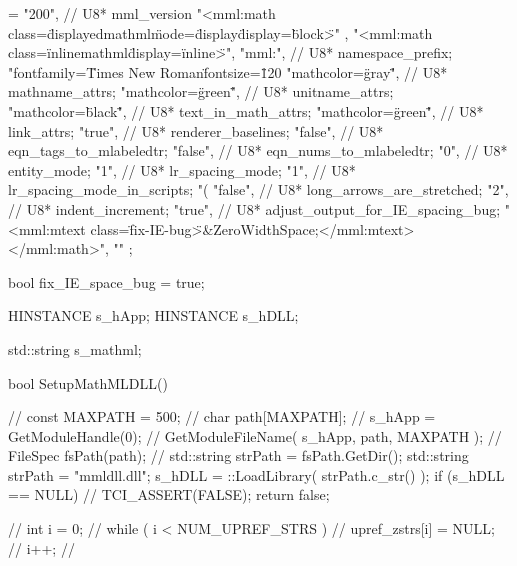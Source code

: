 {{{{{{{{{{\fwbeginmacro
{}\fwplusequals \fwodef \fwbtx[const int NUM_UPREF_STRS = 20;
const int FIX_IE_BUG = 18;

char *upref_zstrs[] = {
  "200",                           // U8* mml_version
  "<mml:math class=\"displayedmathml\" mode=\"display\" display=\"block\">" ,
  "<mml:math class=\"inlinemathml\" display=\"inline\">",
  "mml:",                         //  U8* namespace_prefix;
  "fontfamily=\"Times New Roman\" fontsize=\"120%
  "mathcolor=\"gray\"",           //  U8* mathname_attrs;
  "mathcolor=\"green\"",          //  U8* unitname_attrs;
  "mathcolor=\"black\"",          //  U8* text_in_math_attrs;
  "mathcolor=\"green\"",          //  U8* link_attrs;
  "true",                         //  U8* renderer_baselines;
  "false",                        //  U8* eqn_tags_to_mlabeledtr;
  "false",                        //  U8* eqn_nums_to_mlabeledtr;
  "0",                            //  U8* entity_mode;
  "1",                            //  U8* lr_spacing_mode;
  "1",                            //  U8* lr_spacing_mode_in_scripts;
  "(%
  "false",                        //  U8* long_arrows_are_stretched;
  "2",                            //  U8* indent_increment;
  "true",                         //  U8* adjust_output_for_IE_spacing_bug;
  "<mml:mtext class=\"fix-IE-bug\">&ZeroWidthSpace;</mml:mtext></mml:math>",
  ""
};



bool fix_IE_space_bug =  true;

HINSTANCE s_hApp;
HINSTANCE s_hDLL;

std::string s_mathml;


bool SetupMathMLDLL()
{
    // const MAXPATH = 500;
    // char path[MAXPATH];
    // s_hApp = GetModuleHandle(0);
    // GetModuleFileName( s_hApp, path, MAXPATH );
    // FileSpec fsPath(path);
    // std::string strPath = fsPath.GetDir();
    std::string strPath = "mmldll.dll";
    s_hDLL = ::LoadLibrary( strPath.c_str() );
    if (s_hDLL == NULL) {
      // TCI_ASSERT(FALSE);
      return false;
    }

    // int i = 0;
    // while ( i < NUM_UPREF_STRS ) {
    //   upref_zstrs[i]  =  NULL;
    //   i++;
    // }

}}}}}}}}}}}
